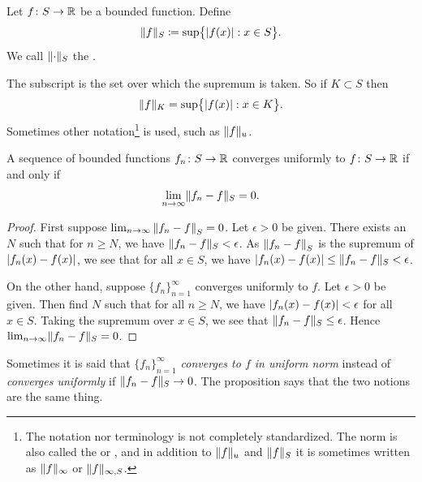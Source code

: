 \begin{defn} \label{def:unifnorm}
Let $f \colon S \to {\mathbb{R}}$ be a bounded function.  Define
\begin{equation*}
\lVert {f} \rVert_S \coloneqq
\sup \bigl\{ \left\lvert {f(x)} \right\rvert : x \in S \bigr\} .
\end{equation*}
We call $\lVert {\cdot} \rVert_S$ the \emph{}.
\end{defn}

The subscript is the set over which the supremum is taken.  So if $K \subset S$
then
\begin{equation*}
\lVert {f} \rVert_K =
\sup \bigl\{ \left\lvert {f(x)} \right\rvert : x \in K \bigr\} .
\end{equation*}
Sometimes other notation\footnote{The notation nor terminology
is not completely standardized.  The norm is also called the
\emph{} or
\emph{}, and in addition
to $\lVert {f} \rVert_u$ and $\lVert {f} \rVert_S$ it is sometimes written
as $\lVert {f} \rVert_{\infty}$ or $\lVert {f} \rVert_{\infty,S}$.}
is used, such as $\lVert {f} \rVert_u$.

\begin{prop}
A sequence of bounded functions $f_n \colon S \to {\mathbb{R}}$ converges
uniformly to $f \colon S \to {\mathbb{R}}$ if and only if
\begin{equation*}
\lim_{n\to\infty} \lVert {f_n - f} \rVert_S = 0 .
\end{equation*}
\end{prop}

\begin{proof}
First suppose 
$\lim_{n\to\infty} \left\lVert {f_n - f} \right\rVert_S = 0$.  Let $\epsilon > 0$ be
given.  There exists an $N$ such that
for $n \geq N$, we have $\lVert {f_n - f} \rVert_S < \epsilon$.  As $\left\lVert {f_n-f} \right\rVert_S$
is the supremum of $\left\lvert {f_n(x)-f(x)} \right\rvert$, we see that for all $x \in S$,
we have $\left\lvert {f_n(x)-f(x)} \right\rvert \leq \lVert {f_n - f} \rVert_S < \epsilon$.

On the other hand, suppose $\{ f_n \}_{n=1}^\infty$ converges uniformly to $f$.
Let $\epsilon > 0$ be given.  Then find $N$ such that 
for all $n \geq N$, we have
$\left\lvert {f_n(x)-f(x)} \right\rvert < \epsilon$ for all $x \in S$.
Taking the supremum over $x \in S$, we see that
$\lVert {f_n - f} \rVert_S \leq \epsilon$.  Hence $\lim_{n\to\infty} \lVert {f_n-f} \rVert_S = 0$.
\end{proof}

Sometimes it is said that \emph{$\{ f_n \}_{n=1}^\infty$ converges to $f$ in uniform norm}
instead of \emph{converges uniformly} if $\lVert {f_n-f} \rVert_S \to 0$.  The proposition
says that the two notions are the same thing.

